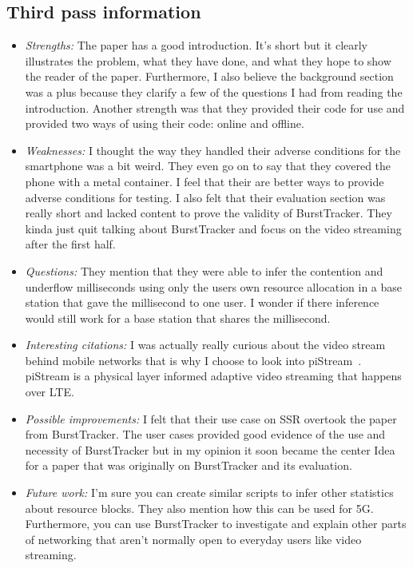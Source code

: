 \documentclass[letterpaper,twocolumn,10pt]{article}
\begin{document}
\subsection{Third pass information}
\label{sec:third}
\begin{itemize}

\item {\it Strengths:} 
The paper has a good introduction. It's short but it clearly illustrates the problem, what they have done, and 
what they hope to show the reader of the paper. Furthermore, I also believe the background section was a plus
 because they clarify a few of the questions I had from reading the introduction. Another strength was that they 
 provided their code for use and provided two ways of using their code: online and offline. 
 
\item {\it Weaknesses:} 
I thought the way they handled their adverse conditions for the smartphone was a bit weird. They even go on to 
say that they covered the phone with a metal container. I feel that their are better ways to provide adverse 
conditions for testing. I also felt that their evaluation section was really short and lacked content to prove the 
validity of BurstTracker. They kinda just quit talking about BurstTracker and focus on the video streaming after
the first half.

\item {\it Questions:} 
They mention that they were able to infer the contention and underflow milliseconds using only the users
own resource allocation in a base station that gave the millisecond to one user. I wonder if there inference 
would still work for a base station that shares the millisecond. 

\item {\it Interesting citations:}
I was actually really curious about the video stream behind mobile networks that is why I choose to look into
piStream~\cite{pistream}. piStream is a physical layer informed adaptive video streaming that happens over LTE.

\item {\it Possible improvements:} 
I felt that their use case on SSR overtook the paper from BurstTracker. The user cases provided good 
evidence of the use and necessity of BurstTracker but in my opinion it soon became the center Idea 
for a paper that was originally on BurstTracker and its evaluation. 

\item {\it Future work:} 
I'm sure you can create similar scripts to infer other statistics about resource blocks. They also mention how 
this can be used for 5G. Furthermore, you can use BurstTracker to investigate and explain other parts
of networking that aren't normally open to everyday users like video streaming. 

\end{itemize}

{
  \small 
  
  
}
\end{document}
